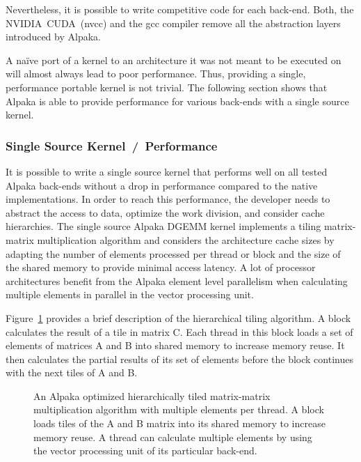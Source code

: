 \documentclass[10pt, twocolumn]{article}
\newcommand{\alpaka}{Alpaka\xspace}
\newcommand{\cuda}{{CUDA}\xspace}
\newcommand{\nvidia}{{NVIDIA}\xspace}
\newcommand{\naive}{na\"ive\xspace}
\begin{document}
Nevertheless, it is possible to write competitive code for each back-end.
Both, the \nvidia~\cuda~(nvcc) and the gcc compiler remove all the abstraction layers introduced by \alpaka.

A \naive port of a kernel to an architecture it was not meant to be executed on will almost always lead to poor performance.
Thus, providing a single, performance portable kernel is not trivial.
The following section shows that \alpaka is able to provide performance for various back-ends with a single source kernel.


\hfill
\subsubsection{Single Source Kernel~/~Performance}
It is possible to write a single source kernel that performs well on all tested \alpaka back-ends without a drop in performance compared to the native implementations.
In order to reach this performance, the developer needs to abstract the access to data, optimize the work division, and consider cache hierarchies.
The single source \alpaka DGEMM kernel implements a tiling matrix-matrix multiplication algorithm and considers the architecture cache sizes by adapting the number of elements processed per thread or block and the size of the shared memory to provide minimal access latency.
A lot of processor architectures benefit from the \alpaka element level parallelism when calculating multiple elements in parallel in the vector processing unit.

Figure~\ref{fig:tiling_kernel} provides a brief description of the hierarchical tiling algorithm.
A block calculates the result of a tile in matrix C.
Each thread in this block loads a set of elements of matrices A and B into shared memory to increase memory reuse.
It then calculates the partial results of its set of elements before the block continues with the next tiles of A and B.

\begin{figure}[tb]
  \centerline
      {}
      \caption{An \alpaka optimized hierarchically tiled matrix-matrix multiplication algorithm with multiple elements per thread.
        A block loads tiles of the A and B matrix into its shared memory to increase memory reuse.
        A thread can calculate multiple elements by using the vector processing unit of its particular back-end.}
  \label{fig:tiling_kernel}
\end{figure}
\end{document}
